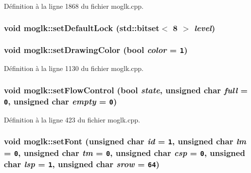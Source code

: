 Définition à la ligne 1868 du fichier moglk.cpp.\hypertarget{classmoglk_1f658975ec72ee94a416e03b80d940ec}{
\subsubsection[{setDefaultLock}]{\setlength{\rightskip}{0pt plus 5cm}void moglk::setDefaultLock (std::bitset$<$ 8 $>$ {\em level})}}
\label{classmoglk_1f658975ec72ee94a416e03b80d940ec}


\hypertarget{classmoglk_a1345114c86c6834619cf9a335458b96}{
\subsubsection[{setDrawingColor}]{\setlength{\rightskip}{0pt plus 5cm}void moglk::setDrawingColor (bool {\em color} = {\tt 1})}}
\label{classmoglk_a1345114c86c6834619cf9a335458b96}




Définition à la ligne 1130 du fichier moglk.cpp.\hypertarget{classmoglk_09137664a708707066b2705b3a6d6894}{
\subsubsection[{setFlowControl}]{\setlength{\rightskip}{0pt plus 5cm}void moglk::setFlowControl (bool {\em state}, \/  unsigned char {\em full} = {\tt 0}, \/  unsigned char {\em empty} = {\tt 0})}}
\label{classmoglk_09137664a708707066b2705b3a6d6894}




Définition à la ligne 423 du fichier moglk.cpp.\hypertarget{classmoglk_cfb8813e8db8de6ef0f34e479952589b}{
\subsubsection[{setFont}]{\setlength{\rightskip}{0pt plus 5cm}void moglk::setFont (unsigned char {\em id} = {\tt 1}, \/  unsigned char {\em lm} = {\tt 0}, \/  unsigned char {\em tm} = {\tt 0}, \/  unsigned char {\em csp} = {\tt 0}, \/  unsigned char {\em lsp} = {\tt 1}, \/  unsigned char {\em srow} = {\tt 64})}}
\label{classmoglk_cfb8813e8db8de6ef0f34e479952589b}




